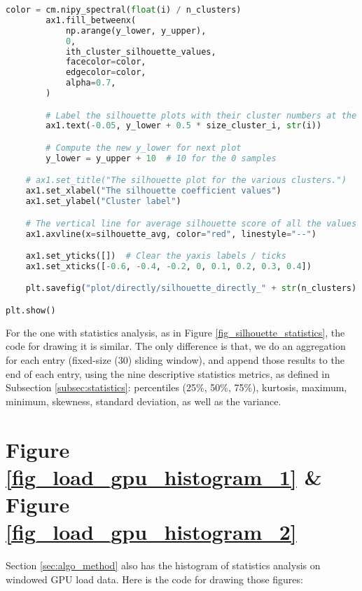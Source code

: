 \begin{lstlisting}[language=Python]
        color = cm.nipy_spectral(float(i) / n_clusters)
        ax1.fill_betweenx(
            np.arange(y_lower, y_upper),
            0,
            ith_cluster_silhouette_values,
            facecolor=color,
            edgecolor=color,
            alpha=0.7,
        )

        # Label the silhouette plots with their cluster numbers at the middle
        ax1.text(-0.05, y_lower + 0.5 * size_cluster_i, str(i))

        # Compute the new y_lower for next plot
        y_lower = y_upper + 10  # 10 for the 0 samples

    # ax1.set_title("The silhouette plot for the various clusters.")
    ax1.set_xlabel("The silhouette coefficient values")
    ax1.set_ylabel("Cluster label")

    # The vertical line for average silhouette score of all the values
    ax1.axvline(x=silhouette_avg, color="red", linestyle="--")

    ax1.set_yticks([])  # Clear the yaxis labels / ticks
    ax1.set_xticks([-0.6, -0.4, -0.2, 0, 0.1, 0.2, 0.3, 0.4])

    plt.savefig("plot/directly/silhouette_directly_" + str(n_clusters) + ".pdf", format="pdf", bbox_inches="tight")

plt.show()
\end{lstlisting}

For the one with statistics analysis, as in Figure \ref{fig_silhouette_statistics}, the code for drawing it is similar. The only difference is that, we do an aggregation for each entry (fixed-size (30) sliding window), and append those results to the end of each entry, using the nine descriptive statistics metrics, as defined in Subsection \ref{subsec:statistics}: percentiles (25\%, 50\%, 75\%), kurtosis, maximum, minimum, skewness, standard deviation, as well as the variance.

\clearpage

\section{Figure \ref{fig_load_gpu_histogram_1} \& Figure \ref{fig_load_gpu_histogram_2}}
Section \ref{sec:algo_method} also has the histogram of statistics analysis on windowed GPU load data. Here is the code for drawing those figures:

